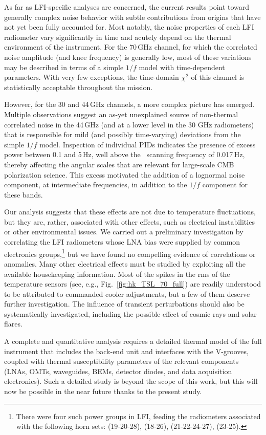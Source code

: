 \documentclass{aa}
\begin{document}
As far as LFI-specific analyses are concerned, the current results
point toward generally complex noise behavior with subtle
contributions from origins that have not yet been fully accounted
for. Most notably, the noise properties of each LFI radiometer vary
significantly in time and acutely depend  on the thermal
environment of the instrument. For the 70\,GHz channel, for which the
correlated noise amplitude (and knee frequency) is generally low, most
of these variations may be described in terms of a simple $1/f$ model
with time-dependent parameters. With very few exceptions, the
time-domain $\chi^2$ of this channel is statistically acceptable
throughout the mission.

However, for the 30 and 44\,GHz channels, a more complex picture has
emerged. Multiple observations suggest an as-yet unexplained source of
non-thermal correlated noise in the 44\,GHz (and at a lower level in
the 30 GHz radiometers) that is responsible for mild (and possibly
time-varying) deviations from the simple $1/f$ model. Inspection of
individual PIDs indicates the presence of excess power between 0.1 and
5\,Hz, well above the \Planck\ scanning frequency of 0.017\,Hz,
thereby affecting the angular scales that are relevant for large-scale
CMB polarization science. This excess motivated the addition of a lognormal noise component, at intermediate frequencies, in addition to the $1/f$ component for these bands. 

Our analysis suggests that these effects are
not due to temperature fluctuations, but they are, rather, associated with other
effects, such as electrical instabilities or other environmental
issues. We carried out a preliminary investigation by correlating
the LFI radiometers whose LNA bias were supplied by common electronics
groups,\footnote{There were four such power groups in LFI, feeding the
  radiometers associated with the following horn sets: (19-20-28),
  (18-26), (21-22-24-27), (23-25).}  but we have found no compelling
evidence of correlations or anomalies.  Many other electrical effects
must be studied by exploiting all the available housekeeping
information.  Most of the spikes in the rms of the temperature sensors
(see, e.g., Fig.~\ref{fig:hk_TSL_70_full}) are readily understood to be
attributed to commanded cooler adjustments, but a few of them deserve further
investigation. The influence of transient perturbations should also be
systematically investigated, including the possible effect of cosmic
rays and solar flares.

A complete and quantitative analysis requires a detailed thermal
model of the full instrument that includes the back-end unit and
interfaces with the V-grooves, coupled with thermal susceptibility
parameters of the relevant components (LNAs, OMTs, waveguides, BEMs,
detector diodes, and data acquisition electronics). Such a detailed study is beyond the
scope of this work, but this will now be possible in the near future thanks to the present
study.
\end{document}
